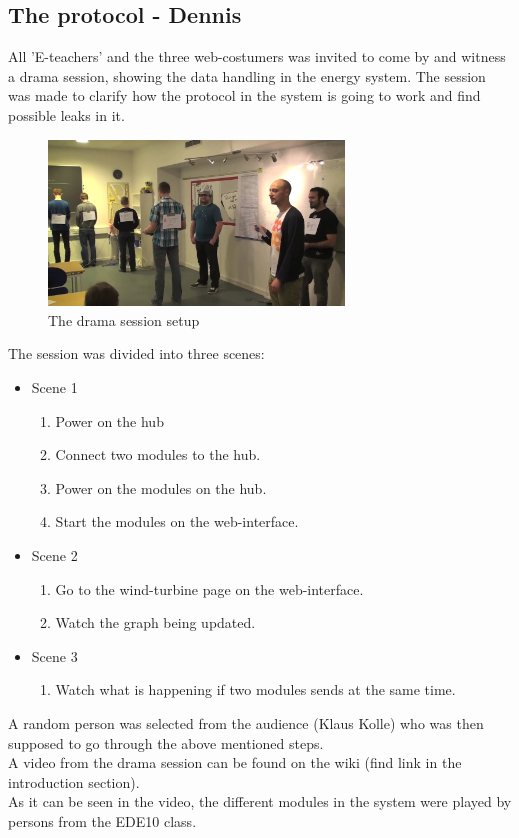 \subsection{The protocol - Dennis}
All 'E-teachers' and the three web-costumers was invited to come by and witness a drama session, showing the data handling in the energy system. The session was made to clarify how the protocol in the system is going to work and find possible leaks in it. 
\begin{figure}[H]
	\center
		\includegraphics[width=0.7\textwidth]{images/drama_setup.png}
   	\caption{The drama session setup}
   	\label{fig:drama_session_setup}
\end{figure}

The session was divided into three scenes:
\begin{itemize}
	\item Scene 1
		\begin{enumerate}
			\item Power on the hub
			\item Connect two modules to the hub.
			\item Power on the modules on the hub.
			\item Start the modules on the web-interface.
		\end{enumerate}
	\item Scene 2
		\begin{enumerate}
			\item Go to the wind-turbine page on the web-interface.
			\item Watch the graph being updated.
		\end{enumerate}
	\item Scene 3
		\begin{enumerate}
			\item Watch what is happening if two modules sends at the same time.
		\end{enumerate}
\end{itemize}
A random person was selected from the audience (Klaus Kolle) who was then supposed to go through the above mentioned steps. 
\\[0.2cm]
A video from the drama session can be found on the wiki (find link in the introduction section).
\\[0.2cm]
As it can be seen in the video, the different modules in the system were played by persons from the EDE10 class. 

